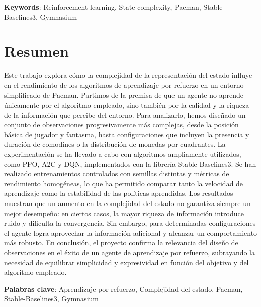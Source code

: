 \vspace{1.5cm}

\textbf{Keywords}: Reinforcement learning, State complexity, Pacman, Stable-Baselines3, Gymnasium


\chapter*{Resumen}

\onehalfspacing

Este trabajo explora cómo la complejidad de la representación del estado influye en el rendimiento de los algoritmos de aprendizaje por refuerzo en un entorno simplificado de Pacman. Partimos de la premisa de que un agente no aprende únicamente por el algoritmo empleado, sino también por la calidad y la riqueza de la información que percibe del entorno. Para analizarlo, hemos diseñado un conjunto de observaciones progresivamente más complejas, desde la posición básica de jugador y fantasma, hasta configuraciones que incluyen la presencia y duración de comodines o la distribución de monedas por cuadrantes.
La experimentación se ha llevado a cabo con algoritmos ampliamente utilizados, como PPO, A2C y DQN, implementados con la librería Stable-Baselines3. Se han realizado entrenamientos controlados con semillas distintas y métricas de rendimiento homogéneas, lo que ha permitido comparar tanto la velocidad de aprendizaje como la estabilidad de las políticas aprendidas.
Los resultados muestran que un aumento en la complejidad del estado no garantiza siempre un mejor desempeño: en ciertos casos, la mayor riqueza de información introduce ruido y dificulta la convergencia. Sin embargo, para determinadas configuraciones el agente logra aprovechar la información adicional y alcanzar un comportamiento más robusto.
En conclusión, el proyecto confirma la relevancia del diseño de observaciones en el éxito de un agente de aprendizaje por refuerzo, subrayando la necesidad de equilibrar simplicidad y expresividad en función del objetivo y del algoritmo empleado.


\vspace{1.5cm}

\textbf{Palabras clave}: Aprendizaje por refuerzo, Complejidad del estado, Pacman, Stable-Baselines3, Gymnasium